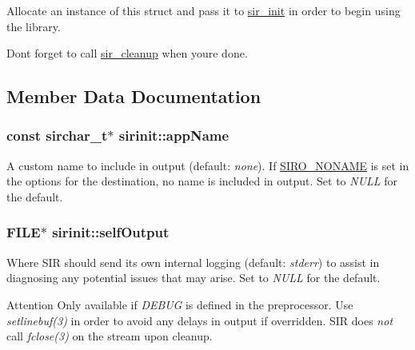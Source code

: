 Allocate an instance of this struct and pass it to \hyperlink{sir_8h_a14924d3a8225bea378ad568a426be99a}{sir\+\_\+init} in order to begin using the library.

Don\textquotesingle{}t forget to call \hyperlink{sir_8h_ae3d423234ff95592b8d800b8bf092489}{sir\+\_\+cleanup} when you\textquotesingle{}re done. 

\subsection{Member Data Documentation}
\subsubsection[{\texorpdfstring{app\+Name}{processName}}]{\setlength{\rightskip}{0pt plus 5cm}const {\bf sirchar\+\_\+t}$\ast$ sirinit\+::app\+Name}\hypertarget{structsirinit_aeb5ae1905f653b2ba48bc46230cfc0cc}{}\label{structsirinit_aeb5ae1905f653b2ba48bc46230cfc0cc}
A custom name to include in output (default\+: {\itshape none}). If \hyperlink{sir_8h_a9ed1c599dfd76231f4e0dadf46bff40ba59020fdfee0aaf393ed80ef7bab4bb4e}{S\+I\+R\+O\+\_\+\+N\+O\+N\+A\+ME} is set in the options for the destination, no name is included in output. Set to {\itshape N\+U\+LL} for the default. 
\subsubsection[{\texorpdfstring{self\+Output}{selfOutput}}]{\setlength{\rightskip}{0pt plus 5cm}F\+I\+LE$\ast$ sirinit\+::self\+Output}\hypertarget{structsirinit_a373d3dc5117db31c29be3651626ad87d}{}\label{structsirinit_a373d3dc5117db31c29be3651626ad87d}
Where S\+IR should send its own internal logging (default\+: {\itshape stderr}) to assist in diagnosing any potential issues that may arise. Set to {\itshape N\+U\+LL} for the default.

\begin{DoxyAttention}{Attention}
Only available if {\itshape D\+E\+B\+UG} is defined in the preprocessor. Use {\itshape setlinebuf(3)} in order to avoid any delays in output if overridden. S\+IR does {\itshape not} call {\itshape fclose(3)} on the stream upon cleanup. 
\end{DoxyAttention}
